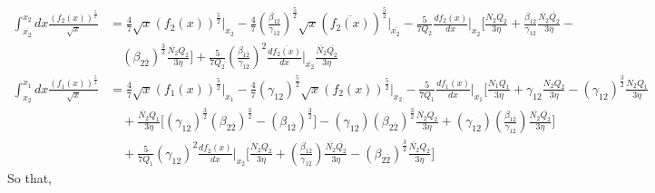 \documentclass[fleqn, 10pt]{article}
\begin{document}
            \begin{equation}
            \begin{split}
            \int^{x_2}_{\overline{x_2}}dx \frac{(f_2(x))^\frac{5}{2}}{\sqrt{x}} &=   \frac{4}{7} \sqrt{x} (f_2(x))^\frac{5}{2} \Bigg|_{x_2} -   \frac{4}{7}\left(\frac{\beta_{1\overline{2}}}{\gamma_{12}}\right)^\frac{5}{2} \sqrt{x} (\overline{f_2(x)})^\frac{5}{2}\Bigg|_{\overline{x_2}} -   \frac{5}{7Q_2} \frac{df_2(x)}{dx}\Bigg|_{x_2} \Bigg[\frac{N_2Q_2}{3\eta}  +\frac{\beta_{1\overline{2}}}{\gamma_{12}}\frac{\overline{N_2}\overline{Q_2}}{3\eta} - \\ & \quad (\beta_{2\overline{2}})^\frac{3}{2}\frac{\overline{N_2} Q_2}{3\eta}\Biggr] +   \frac{5}{7Q_2} \left(\frac{\beta_{1\overline{2}}}{\gamma_{12}}\right)^2 \frac{d\overline{f_2(x)}}{dx} \Bigg|_{\overline{x_2}} \frac{\overline{N_2}\overline{Q_2}}{3\eta}
            \label{30}
            \end{split}
            \end{equation}
            \begin{equation}
            \begin{split}
            \int^{x_1}_{x_2} dx \frac{(f_1(x))^\frac{5}{2}}{\sqrt{x}} &=   \frac{4}{7} \sqrt{x} (f_1(x))^\frac{5}{2} \Bigg|_{x_1} -   \frac{4}{7} (\gamma_{12})^\frac{5}{2}\sqrt{x}(f_2(x))^\frac{5}{2}\Bigg|_{x_2}  -   \frac{5}{7Q_1} \frac{df_1(x)}{dx}\Bigg|_{x_1}\Biggl[ \frac{N_1Q_1}{3\eta} + \gamma_{12} \frac{N_2 Q_2}{3\eta} - (\gamma_{12})^\frac{3}{2} \frac{N_2 Q_1}{3\eta} \\ & \quad + \frac{\overline{N_2}Q_1}{3\eta}\bigl[(\gamma_{12})^\frac{3}{2} (\beta_{2\overline{2}})^\frac{3}{2}  - (\beta_{1\overline{2}})^\frac{3}{2}\bigr]   - (\gamma_{12}) (\beta_{2\overline{2}})^\frac{3}{2}\frac{\overline{N_2}Q_2}{3\eta} + (\gamma_{12})\left(\frac{\beta_{1\overline{2}}}{\gamma_{12}}\right)\frac{\overline{N_2}\overline{Q_2}}{3\eta}\Biggr]  \\ & \quad +   \frac{5}{7Q_1} (\gamma_{12})^2 \frac{df_2(x)}{dx}\Bigg|_{x_2} \Biggl[ \frac{N_2Q_2}{3\eta} + \left(\frac{\beta_{1\overline{2}}}{\gamma_{12}}\right) \frac{\overline{N_2}\overline{Q_2}}{3\eta} - (\beta_{2\overline{2}})^\frac{3}{2} \frac{\overline{N_2}Q_2}{3\eta}\Biggr] 
            \label{31}
            \end{split}
            \end{equation}
            So that,
\end{document}
